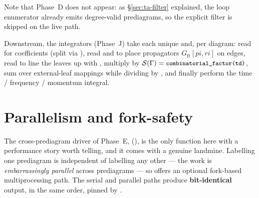 \begin{center}
\end{center}

Note that Phase~D does not appear: as \S\ref{sec:ta-filter} explained, the loop
enumerator already emits degree-valid prediagrams, so the explicit filter is
skipped on the live path.

Downstream, the integrators (Phase~J) take each unique  and,
per diagram: read  for coefficients (split via
), read  and
 to place propagators $G_{\mathrm{ft}}[pi, ri]$ on
edges, read  to line the leaves up with
, multiply by $\mathcal{S}(\Gamma) =
\texttt{\small combinatorial\_factor(td)}$, sum over external-leaf mappings while dividing
by , and finally perform the time /
frequency / momentum integral.

\section{Parallelism and fork-safety}\label{sec:ta-fork}

The cross-prediagram driver of Phase~E, 
(), is the only function here with a
performance story worth telling, and it comes with a genuine landmine. Labelling
one prediagram is independent of labelling any other --- the work is
\emph{embarrassingly parallel} across prediagrams --- so 
offers an optional fork-based multiprocessing path. The serial and parallel paths
produce \textbf{bit-identical} output, in the same order, pinned by
.

